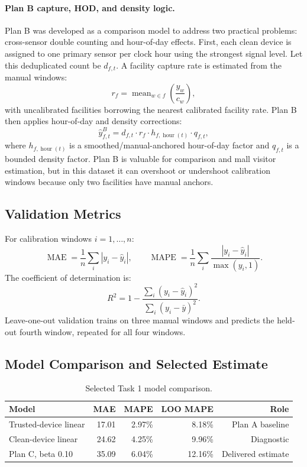 \documentclass[11pt,a4paper]{article}
\begin{document}
\paragraph{Plan B capture, HOD, and density logic.}
Plan B was developed as a comparison model to address two practical problems: cross-sensor double counting and hour-of-day effects. First, each clean device is assigned to one primary sensor per clock hour using the strongest signal level. Let this deduplicated count be \(d_{f,t}\). A facility capture rate is estimated from the manual windows:
\[
  r_f = \operatorname{mean}_{w\in f}\left(\frac{y_w}{c_w}\right),
\]
with uncalibrated facilities borrowing the nearest calibrated facility rate. Plan B then applies hour-of-day and density corrections:
\[
  \hat{y}^{B}_{f,t} = d_{f,t} \cdot r_f \cdot h_{f,\operatorname{hour}(t)} \cdot q_{f,t},
\]
where \(h_{f,\operatorname{hour}(t)}\) is a smoothed/manual-anchored hour-of-day factor and \(q_{f,t}\) is a bounded density factor. Plan B is valuable for comparison and mall visitor estimation, but in this dataset it can overshoot or undershoot calibration windows because only two facilities have manual anchors.

\subsection{Validation Metrics}

For calibration windows \(i=1,\dots,n\):
\[
  \operatorname{MAE} = \frac{1}{n}\sum_i |y_i-\hat{y}_i|,
  \qquad
  \operatorname{MAPE} = \frac{1}{n}\sum_i \frac{|y_i-\hat{y}_i|}{\max(y_i,1)}.
\]
The coefficient of determination is:
\[
  R^2 = 1 - \frac{\sum_i (y_i-\hat{y}_i)^2}{\sum_i (y_i-\bar{y})^2}.
\]
Leave-one-out validation trains on three manual windows and predicts the held-out fourth window, repeated for all four windows.

\subsection{Model Comparison and Selected Estimate}

\begin{table}[!htbp]
\centering
\caption{Selected Task 1 model comparison.}
\begin{tabular}{lrrrr}
\toprule
Model & MAE & MAPE & LOO MAPE & Role \\
\midrule
Trusted-device linear & 17.01 & 2.97\% & 8.18\% & Plan A baseline \\
Clean-device linear & 24.62 & 4.25\% & 9.96\% & Diagnostic \\
Plan C, beta 0.10 & 35.09 & 6.04\% & 12.16\% & Delivered estimate \\
\bottomrule
\end{tabular}
\end{table}
\end{document}

